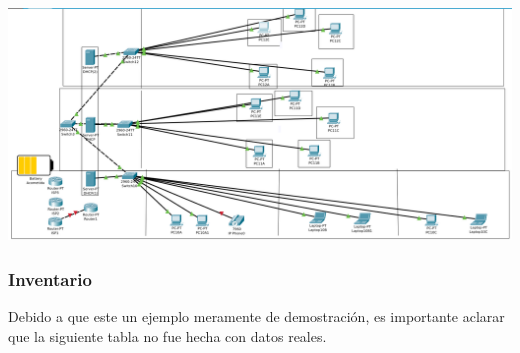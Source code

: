 \documentclass[spanish,12pt,letterpaper]{article}
\begin{document}
\begin{center}
  \includegraphics[scale=.28]{nuevoPP.png}
\end{center}

\subsubsection{Inventario}
Debido a que este un ejemplo meramente de demostración, es importante aclarar que
la siguiente tabla no fue hecha con datos reales.
\end{document}
